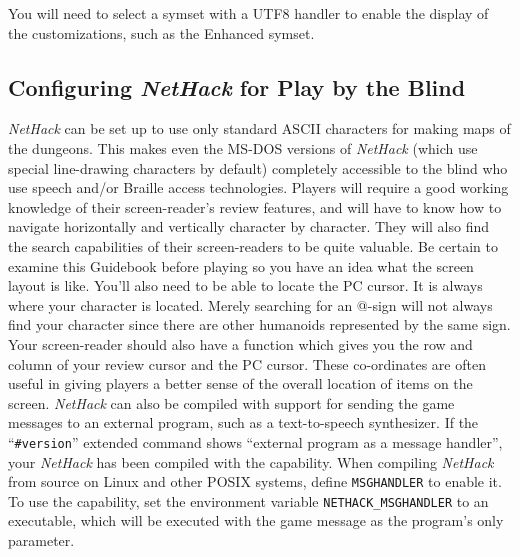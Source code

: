 You will need to select a symset with a UTF8 handler to enable the
display of the customizations, such as the Enhanced symset.

\subsection*{Configuring {\it NetHack\/} for Play by the Blind}

{\it NetHack\/} can be set up to use only standard ASCII characters for making
maps of the dungeons. This makes even the MS-DOS versions of {\it NetHack}
(which use special line-drawing characters by default) completely
accessible to the blind who use speech and/or Braille access technologies.
Players will require a good working knowledge of their screen-reader's
review features, and will have to know how to navigate horizontally and
vertically character by character. They will also find the search
capabilities of their screen-readers to be quite valuable. Be certain to
examine this Guidebook before playing so you have an idea what the screen
layout is like. You'll also need to be able to locate the PC cursor. It is
always where your character is located. Merely searching for an @-sign will
not always find your character since there are other humanoids represented
by the same sign. Your screen-reader should also have a function which
gives you the row and column of your review cursor and the PC cursor.
These co-ordinates are often useful in giving players a better sense of the
overall location of items on the screen.
{\it NetHack\/} can also be compiled with support for sending the game
messages to an external program, such as a text-to-speech synthesizer. If
the ``{\tt \#version}'' extended command shows ``external program as a
message handler'', your {\it NetHack\/}
has been compiled with the capability. When compiling {\it NetHack\/}
from source
on Linux and other POSIX systems, define {\tt MSGHANDLER\/} to enable it.
To use
the capability, set the environment variable {\tt NETHACK\_MSGHANDLER\/} to
an executable, which will be executed with the game message as the program's
only parameter.

